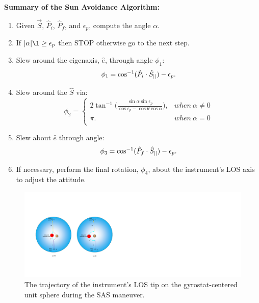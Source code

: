 \documentclass[journal ]{new-aiaa}
\begin{document}
	\textbf{Summary of the Sun Avoidance Algorithm:}	
	\begin{enumerate}
	\item Given $\vec{S}$, $\hat{P}_i$, $\hat{P}_f$, and $\epsilon_p$, compute the angle $\alpha$.
                      \item If $|\alpha|\l\geq \epsilon_p$ then STOP otherwise go to the next step. 
		\item Slew around the eigenaxis, $\hat{e}$, through angle $\phi_1$:		
		\begin{equation}\label{phi1}
		\phi_1 = \cos^{-1}(\hat{P}_i\cdot\hat{S}_{||})-\epsilon_p.\\
		\end{equation}
		\item Slew around the $\hat{S}$ via:
		\begin{equation}\label{phi2}
		\phi_2=\left\{
		\begin{array}{ll}
		2\tan^{-1}\Big( \frac{\sin\alpha \sin\epsilon_p}{\cos\epsilon_p-\cos\theta\cos\alpha}\Big),& when\  \alpha\neq 0\\
		\pi.& when\ \alpha=0\\
		\end{array}
		\right.
		\end{equation}
		\item Slew about $\hat{e}$ through angle:
		\begin{equation}\label{phi3}
		\phi_3 = \cos^{-1}(\hat{P}_f\cdot\hat{S}_{||})-\epsilon_p.\\
		\end{equation}		
		\item If necessary, perform the final rotation, $\phi_4$, about the instrument's LOS axis to adjust the attitude. 
	\end{enumerate}

	
	
	\begin{figure}[h!]
		\centering
		\includegraphics[width=6in]{SASSchematic3}
		\caption{The trajectory of the instrument's LOS tip on the gyrostat-centered unit sphere during the SAS maneuver.}
	\end{figure}
	
\end{document}
